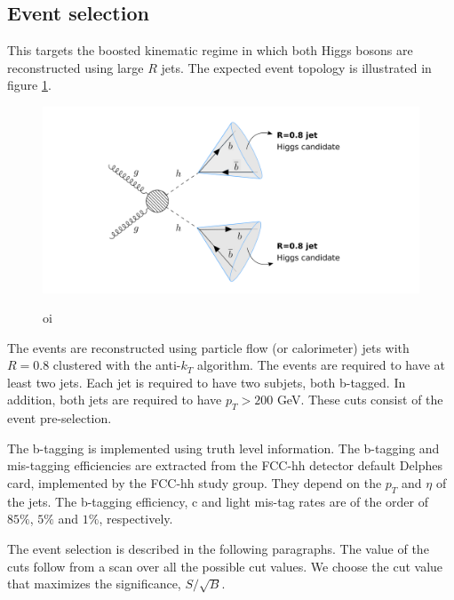 \subsection{Event selection}

This targets the boosted kinematic regime in which both Higgs bosons are reconstructed using large $R$ jets. The expected event topology is illustrated in figure \ref{fig:boosted}.

\begin{figure}[h]
	\centering
	\includegraphics[trim={4.5cm .5cm 1cm .5cm},clip,width=1.2\linewidth]{./images/boosted1.png}
	\label{fig:boosted}
	\caption{oi}
\end{figure}

The events are reconstructed using particle flow (or calorimeter) jets with $R=0.8$ clustered with the anti-$k_T$ algorithm. The events are required to have at least two jets. Each jet is required to have two subjets, both b-tagged. In addition, both jets are required to have $p_T>200$ GeV. These cuts consist of the event pre-selection.

The b-tagging is implemented using truth level information. The b-tagging and mis-tagging efficiencies are extracted from the FCC-hh detector default Delphes card, implemented by the FCC-hh study group. They depend on the $p_T$ and $\eta$ of the jets. The b-tagging efficiency, c and light mis-tag rates are of the order of $85\%$, $5\%$ and $1\%$, respectively.

The event selection is described in the following paragraphs. The value of the cuts follow from a scan over all the possible cut values. We choose the cut value that maximizes the significance, $S/\sqrt{B}$. 

